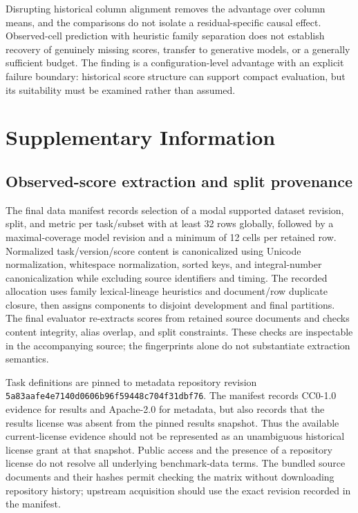 \documentclass{article}
\begin{document}
Disrupting historical column alignment removes the advantage over column means, and the comparisons do not isolate a residual-specific causal effect. Observed-cell prediction with heuristic family separation does not establish recovery of genuinely missing scores, transfer to generative models, or a generally sufficient budget. The finding is a configuration-level advantage with an explicit failure boundary: historical score structure can support compact evaluation, but its suitability must be examined rather than assumed.

\clearpage



\clearpage
\appendix
\begingroup
\renewcommand{\thesection}{}
\section{Supplementary Information}
\endgroup
\thispagestyle{plain}
\subsection{Observed-score extraction and split provenance}
The final data manifest records selection of a modal supported dataset revision, split, and metric per task/subset with at least 32 rows globally, followed by a maximal-coverage model revision and a minimum of 12 cells per retained row. Normalized task/version/score content is canonicalized using Unicode normalization, whitespace normalization, sorted keys, and integral-number canonicalization while excluding source identifiers and timing. The recorded allocation uses family lexical-lineage heuristics and document/row duplicate closure, then assigns components to disjoint development and final partitions. The final evaluator re-extracts scores from retained source documents and checks content integrity, alias overlap, and split constraints. These checks are inspectable in the accompanying source; the fingerprints alone do not substantiate extraction semantics.

Task definitions are pinned to metadata repository revision
\texttt{5a83aafe4e7140d0606b96f59448c704f31dbf76}.
The manifest records CC0-1.0 evidence for results and Apache-2.0 for metadata, but also records that the results license was absent from the pinned results snapshot. Thus the available current-license evidence should not be represented as an unambiguous historical license grant at that snapshot. Public access and the presence of a repository license do not resolve all underlying benchmark-data terms. The bundled source documents and their hashes permit checking the matrix without downloading repository history; upstream acquisition should use the exact revision recorded in the manifest.
\end{document}
